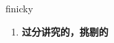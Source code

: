
\begin{frame}
{\huge finicky}
\begin{center}
\begin{enumerate}\Large
  \item \textbf{过分讲究的，挑剔的}
\end{enumerate}
\end{center}
\end{frame}
